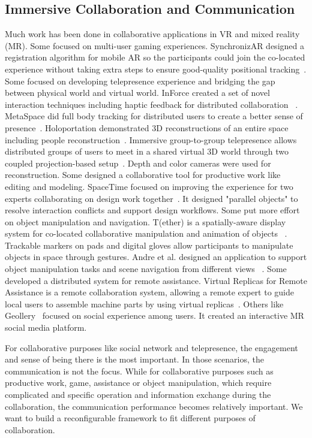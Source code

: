 \documentclass{sigchi}
\begin{document}
\subsection{Immersive Collaboration and Communication}
Much work has been done in collaborative applications in VR and mixed reality (MR). Some focused on multi-user gaming experiences. SynchronizAR designed a registration algorithm for mobile AR so the participants could join the co-located experience without taking extra steps to ensure good-quality positional tracking~\cite{huo2018synchronizar}.
Some focused on developing telepresence experience and bridging the gap between physical world and virtual world. InForce created a set of novel interaction techniques including haptic feedback for distributed collaboration ~\cite{nakagaki2019inforce}.
MetaSpace did full body tracking for distributed users to create a better sense of presence~\cite{sra2015metaspace}.
Holoportation demonstrated 3D reconstructions of an entire space including people reconstruction~\cite{orts2016holoportation}.
Immersive group-to-group telepresence allows distributed groups of users to meet in a shared virtual 3D world through two coupled projection-based setup~\cite{beck2013immersive}. Depth and color cameras were used for reconstruction. Some designed a collaborative tool for productive work like editing and modeling. SpaceTime focused on improving the experience for two experts collaborating on design work together~\cite{xia2018spacetime}. It designed "parallel objects" to resolve interaction conflicts and support design workflows. Some put more effort on object manipulation and navigation. T(ether) is a spatially-aware display system for co-located collaborative manipulation and animation of objects ~\cite{lakatos2014t}. Trackable markers on pads and digital gloves allow participants to manipulate objects in space through gestures. Andre et al. designed an application to support object manipulation tasks and scene navigation from different views ~\cite{kunert2019multi}. Some developed a distributed system for remote assistance. Virtual Replicas for Remote Assistance is a remote collaboration system, allowing a remote expert to guide local users to assemble machine parts by using virtual replicas~\cite{oda2015virtual}. Others like Geollery~\cite{du2019geollery, du2016social} focused on social experience among users. It created an interactive MR social media platform.

For collaborative purposes like social network and telepresence, the engagement and sense of being there is the most important. In those scenarios, the communication is not the focus. While for collaborative purposes such as productive work, game, assistance or object manipulation, which require complicated and specific operation and information exchange during the collaboration, the communication performance becomes relatively important. We want to build a reconfigurable framework to fit different purposes of collaboration.
\end{document}
